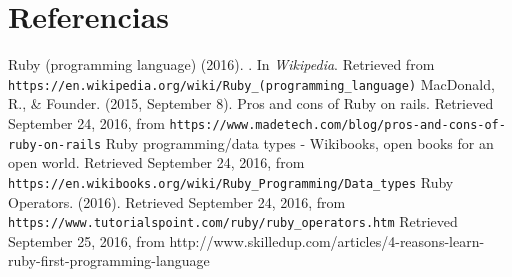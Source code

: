 \documentclass{IEEEtran}
\begin{document}
\section{Referencias}

\begin{thebibliography}{99}

 Ruby (programming language) (2016). . In \emph{Wikipedia}. Retrieved from \texttt{https://en.wikipedia.org/wiki/Ruby\_(programming\_language)}
 MacDonald, R., \& Founder. (2015, September 8). Pros and cons of Ruby on rails. Retrieved September 24, 2016, from \texttt{https://www.madetech.com/blog/pros-and-cons-of-ruby-on-rails}
 Ruby programming/data types - Wikibooks, open books for an open world. Retrieved September 24, 2016, from \texttt{https://en.wikibooks.org/wiki/Ruby\_Programming/Data\_types}
 Ruby Operators. (2016). Retrieved September 24, 2016, from \texttt{https://www.tutorialspoint.com/ruby/ruby\_operators.htm}
 Retrieved September 25, 2016, from http://www.skilledup.com/articles/4-reasons-learn-ruby-first-programming-language

\end{thebibliography}
\end{document}
